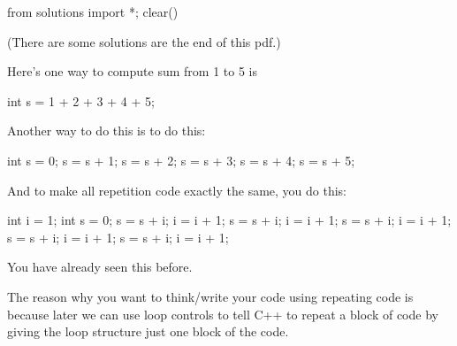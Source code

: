\begin{python0}
from solutions import *; clear()
\end{python0}

(There are some solutions are the end of this pdf.)

Here's one way to compute sum from 1 to 5 is
\begin{console}
int s = 1 + 2 + 3 + 4 + 5; 
\end{console}

Another way to do this is to do this:
\begin{console}
int s = 0;
s = s + 1;
s = s + 2;
s = s + 3;
s = s + 4;
s = s + 5; 
\end{console}

And to make all repetition code exactly the same, you do this:
\begin{console}
int i = 1;
int s = 0;
s = s + i;
i = i + 1;
s = s + i;
i = i + 1;
s = s + i;
i = i + 1;
s = s + i;
i = i + 1;
s = s + i;
i = i + 1; 
\end{console}

You have already seen this before.

The reason why you want to think/write your code using repeating code is
because later we can use loop controls to tell C++ to repeat a block of
code by giving the loop structure just one block of the code.

